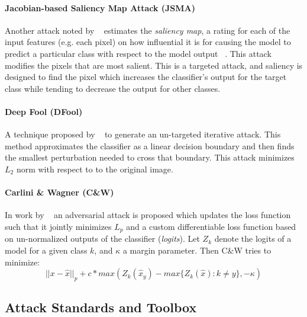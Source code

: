 \paragraph{Jacobian-based Saliency Map Attack (JSMA)} Another attack noted by  ~\citet{papernot_limitations_2015}
  estimates the \emph{saliency map}, a rating for each of the input features (e.g. each pixel) on how influential it is for causing the model to predict a particular class with respect to the model output ~\citep{wiyatno2018saliency}. This attack modifies the pixels that are most salient. This is a targeted attack, and saliency is designed to find the pixel which increases the classifier's output for the target class while tending to decrease the output for other classes.

\paragraph{Deep Fool (DFool)} A technique proposed by ~\citet{moosavi-dezfooli_deepfool:_2015}
  to generate an un-targeted iterative attack. 
This method approximates the classifier as a linear decision boundary and then finds the smallest perturbation needed to cross that boundary.
This attack minimizes $L_2$ norm with respect to  to the original image.

\paragraph{Carlini \& Wagner (C\&W)} In work by ~\citet{carlini_towards_2016}
  an adversarial attack is proposed which updates the loss function such that it jointly minimizes $L_p$ and a custom differentiable loss function based on un-normalized outputs of the classifier (\textit{logits}). 
Let $Z_k$ denote the logits of a model for a given class $k$, and $\kappa$ a margin parameter. Then C\&W tries to minimize:
\begin{equation}
|| x - \hat{x} ||_p + c* max\left(Z_k(\hat{x}_y) - max\{Z_k(\hat{x}) : k \neq y\},-\kappa\right)
\end{equation}

\subsection{Attack Standards and Toolbox}

